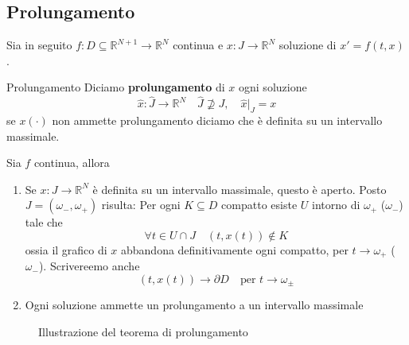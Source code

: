 \subsection{Prolungamento}
Sia in seguito \(f : D\subseteq \mathbb{R}^{N+1} \to \mathbb{R}^{N} \) continua
e \(x : J \to \mathbb{R}^{N}\) soluzione di \(x' = f(t, x)\).

\begin{definition}{Prolungamento}
    Diciamo \textbf{prolungamento} di \(x\) ogni soluzione
    \[
        \hat{x} : \hat{J} \to \mathbb{R}^{N} \quad \hat{J} \not\supseteq J,
        \quad \hat{x}|_J = x
    \]
    se \(x(\cdot )\) non ammette prolungamento diciamo che è definita su un
    intervallo massimale.
\end{definition}
\begin{theorem}[Prolungamento]\label{th:prolungamento}
    Sia \(f\) continua, allora
\begin{enumerate}[label = \alph*)]
    \item Se \(x : J \to \mathbb{R}^{N}\) è definita su un intervallo massimale,
        questo è aperto. Posto \(J = (\omega_-, \omega_+)\) risulta:
        Per ogni \(K \subseteq D \) compatto esiste \(U\) intorno di
        \(\omega_+\) (\(\omega_-\)) tale che
        \[
            \forall t \in U \cap J \quad (t, x(t)) \not\in K
        \]
        ossia il grafico di \(x\) abbandona definitivamente ogni compatto, per
        \(t \to \omega_+ \) (\(\omega_-\)). Scrivereemo anche
        \[
            (t, x(t)) \to \partial D \quad \text{per } t \to \omega_{\pm} 
        \]
    \item Ogni soluzione ammette un prolungamento a un intervallo massimale

\end{enumerate}
\end{theorem}

\begin{figure}[ht]
    \centering
    \caption{Illustrazione del teorema di prolungamento}\label{fig:proprieta_massimale}
\end{figure}

